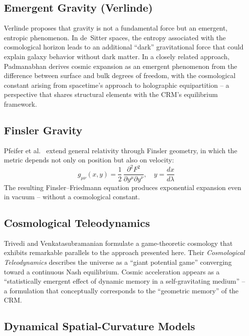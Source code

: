 \documentclass[aps,prd,twocolumn,superscriptaddress,nofootinbib]{revtex4-2}
\begin{document}
\subsection{Emergent Gravity (Verlinde)}

Verlinde \cite{Verlinde2011, Verlinde2017} proposes that gravity is not a fundamental force but an emergent, entropic phenomenon. In de~Sitter spaces, the entropy associated with the cosmological horizon leads to an additional ``dark'' gravitational force that could explain galaxy behavior without dark matter. In a closely related approach, Padmanabhan \cite{Padmanabhan2012} derives cosmic expansion as an emergent phenomenon from the difference between surface and bulk degrees of freedom, with the cosmological constant arising from spacetime's approach to holographic equipartition -- a perspective that shares structural elements with the CRM's equilibrium framework.

\subsection{Finsler Gravity}

Pfeifer et al.\ \cite{Pfeifer2025} extend general relativity through Finsler geometry, in which the metric depends not only on position but also on velocity:
\begin{equation}
g_{\mu\nu}(x, y) = \frac{1}{2}\,\frac{\partial^2 F^2}{\partial y^\mu \partial y^\nu}, \quad y = \frac{dx}{d\lambda}
\end{equation}
The resulting Finsler--Friedmann equation produces exponential expansion even in vacuum -- without a cosmological constant.


\subsection{Cosmological Teleodynamics}

Trivedi and Venkatasubramanian \cite{Trivedi2025} formulate a game-theoretic cosmology that exhibits remarkable parallels to the approach presented here. Their \textit{Cosmological Teleodynamics} describes the universe as a ``giant potential game'' converging toward a continuous Nash equilibrium. Cosmic acceleration appears as a ``statistically emergent effect of dynamic memory in a self-gravitating medium'' -- a formulation that conceptually corresponds to the ``geometric memory'' of the CRM.


\subsection{Dynamical Spatial-Curvature Models}
\label{subsec:dynamical_curvature}
\end{document}

